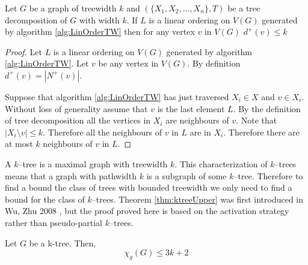 \begin{lemma}[Askes] \label{Lemma_TWLinOrdBound}
    Let $G$ be a graph of treewidth $k$ and $(\{X_1,X_2,\dots,X_n\},T)$ be a tree decomposition of $G$ with width $k$.
    If $L$ is a linear ordering on $V(G)$ generated by algorithm \ref{alg:LinOrderTW} then for any vertex $v$ in $V(G)$ 
    $d^+(v) \leq k$
\end{lemma}

\begin{proof}    
    Let $L$ is a linear ordering on $V(G)$ generated by algorithm \ref{alg:LinOrderTW}. Let $v$ be any vertex in $V(G)$. By definition $d^+(v) = |N^+(v)|$.%
    
    Suppose that algorithm \ref{alg:LinOrderTW} has just traversed $X_i\in X$ and $v\in X_i$. Without loss of generality assume that $v$ is the last element $L$. By the definition of tree decomposition all the vertices in $X_i$ are neighbours of $v$. Note that $|X_i\setminus v|\leq k$. Therefore all the neighbours of $v$ in $L$ are in $X_i$. Therefore there are at most $k$ neighbours of $v$ in $L$.   
\end{proof}


A $k$--tree is a maximal graph with treewidth $k$. This characterization of $k$--trees means that a graph with pathwidth $k$ is a subgraph of some $k$--tree. Therefore to find a bound the class of trees with bounded treewidth we only need to find a bound for the class of $k$--trees. Theorem \ref{thm:ktreeUpper} was first introduced in Wu, Zhu 2008 \cite{WuZhu2008}, but the proof proved here is based on the activation strategy rather than pseudo-partial $k$--trees.
\begin{theorem} \label{thm:ktreeUpper}
        Let $G$ be a k-tree. Then, 
        \[\chi_g(G) \leq 3k + 2\]
\end{theorem}

